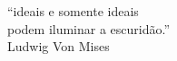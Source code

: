 \begin{buttonpage}
	\begin{flushright}
“ideais e somente ideais\\
podem iluminar a escuridão.”\\
Ludwig Von Mises 
    \end{flushright}
\end{buttonpage}
